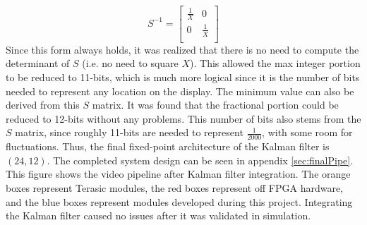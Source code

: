 \documentclass[11pt]{article} %
\begin{document}
\begin{equation}
S^{-1} = 
\begin{bmatrix}
\frac{1}{X} & 0 \\
0 & \frac{1}{X}  \\
\end{bmatrix}
\end{equation}
Since this form always holds, it was realized that there is no need to compute the determinant of $S$ (i.e. no need to square $X$). This allowed the max integer portion to be reduced to 11-bits, which is much more logical since it is the number of bits needed to represent any location on the display. The minimum value can also be derived from this $S$ matrix. It was found that the fractional portion could be reduced to 12-bits without any problems. This number of bits also stems from the $S$ matrix, since roughly 11-bits are needed to represent $\frac{1}{2000}$, with some room for fluctuations. Thus, the final fixed-point architecture of the Kalman filter is $(24, 12)$. The completed system design can be seen in appendix \ref{sec:finalPipe}. This figure shows the video pipeline after Kalman filter integration. The orange boxes represent Terasic modules, the red boxes represent off FPGA hardware, and the blue boxes represent modules developed during this project. Integrating the Kalman filter caused no issues after it was validated in simulation.
\end{document}
